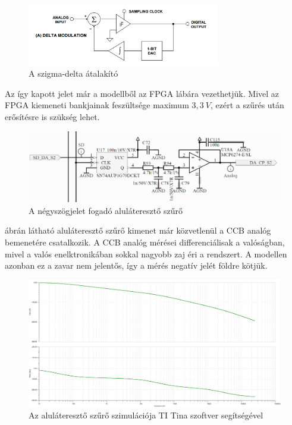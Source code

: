 \begin{figure}[!h]
	\centering
	\includegraphics[width = 0.75\textwidth]{figures/sigmadelta.png}
	\caption{A szigma-delta átalakító} 
	\label{fig:sigmadelta}
\end{figure}

Az így kapott jelet már a modellből az FPGA lábára vezethetjük. Mivel az FPGA kiemeneti bankjainak feszültsége maximum $3,3\ V$, ezért a szűrés után erősítésre is szükség lehet.

\begin{figure}[!h]
	\centering
	\includegraphics[width = \textwidth]{figures/lowpassfilter.png}
	\caption{A négyszögjelet fogadó aluláteresztő szűrő} 
	\label{fig:lowpass}
\end{figure}

 ábrán látható aluláteresztő szűrő kimenet már közvetlenül a CCB analóg bemenetére csatalkozik. A CCB analóg mérései differenciálisak a valóságban, mivel a valós enelktronikában sokkal nagyobb zaj éri a rendszert. A modellen azonban ez a zavar nem jelentős, így a mérés negatív jelét földre kötjük.

\begin{figure}[!h]
	\centering
	\includegraphics[width = \textwidth]{figures/sigma_delta_sim.png}
	\caption{Az aluláteresztő szűrő szimulációja TI Tina szoftver segítségével} 
	\label{fig:lowpass_sim}
\end{figure}

